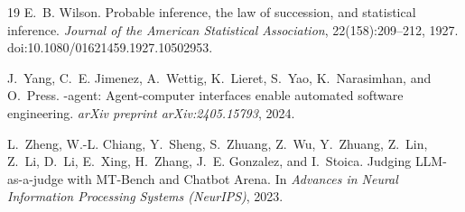 \documentclass[11pt,letterpaper]{article}
\begin{document}
\begin{thebibliography}{19}
E.~B. Wilson.
\newblock Probable inference, the law of succession, and statistical inference.
\newblock \emph{Journal of the American Statistical Association}, 22(158):209--212, 1927. doi:10.1080/01621459.1927.10502953.

J.~Yang, C.~E. Jimenez, A.~Wettig, K.~Lieret, S.~Yao, K.~Narasimhan, and O.~Press.
-agent: Agent-computer interfaces enable automated software engineering.
\newblock \emph{arXiv preprint arXiv:2405.15793}, 2024.

L.~Zheng, W.-L. Chiang, Y.~Sheng, S.~Zhuang, Z.~Wu, Y.~Zhuang, Z.~Lin, Z.~Li, D.~Li, E.~Xing, H.~Zhang, J.~E. Gonzalez, and I.~Stoica.
\newblock Judging {LLM}-as-a-judge with {MT-Bench} and Chatbot Arena.
\newblock In \emph{Advances in Neural Information Processing Systems (NeurIPS)}, 2023.

\end{thebibliography}
\end{document}
